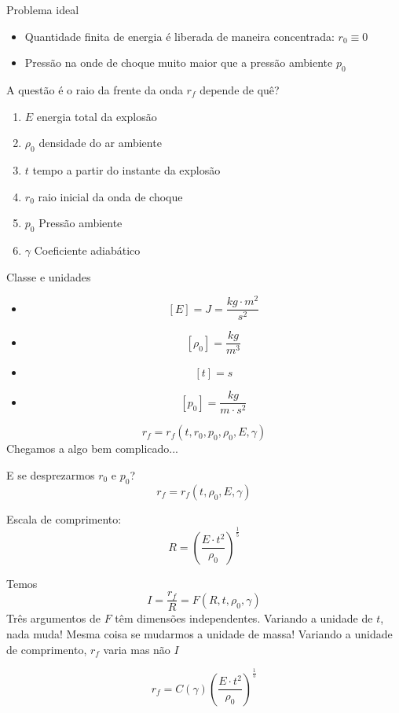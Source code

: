 \documentclass{beamer}
\begin{document}
\begin{frame}{Problema ideal}
  \begin{itemize}
  \item Quantidade finita de energia é liberada de maneira concentrada: $r_0 \equiv 0$
  \item Pressão na onde de choque muito maior que a pressão ambiente $p_0$
  \end{itemize}
  A questão é o raio da frente da onda $r_f$ depende de quê?
  \begin{enumerate}
  \item $E$ energia total da explosão
  \item $\rho_0$ densidade do ar ambiente
  \item $t$ tempo a partir do instante da explosão
  \item $r_0$ raio inicial da onda de choque
  \item $p_0$ Pressão ambiente
  \item $\gamma$ Coeficiente adiabático
  \end{enumerate}

\end{frame}

\begin{frame}{Classe e unidades}
  \begin{itemize}
  \item \[ [E] = J = \frac{kg\cdot m^2}{s^2}\]
  \item \[ [\rho_0] = \frac{kg}{m^3} \]
  \item \[ [t] = s \]
  \item \[ [p_0] = \frac{kg}{m\cdot s^2} \]
  \end{itemize}

  \[
  r_f = r_f\left(t, r_0, p_0, \rho_0, E, \gamma\right)
  \]
  Chegamos a algo bem complicado...
\end{frame}

\begin{frame}{E se desprezarmos $r_0$ e $p_0$?}
  \[
  r_f = r_f \left(t, \rho_0, E, \gamma\right)
  \]
  
  Escala de comprimento:
  \[
  R = \left( \frac{E \cdot t^2}{\rho_0} \right)^\frac{1}{5}
  \]

  Temos
  \[
  I = \frac{r_f}{R} = F\left(R, t, \rho_0, \gamma\right)
  \]
  Três argumentos de $F$ têm dimensões  independentes. Variando a unidade de $t$, nada muda! Mesma coisa se mudarmos a unidade de massa! Variando a unidade de comprimento, $r_f$ varia mas não $I$

  \[
  r_f = C(\gamma)\left( \frac{E \cdot t^2}{\rho_0} \right)^\frac{1}{5}
  \]
  
\end{frame}
\end{document}
